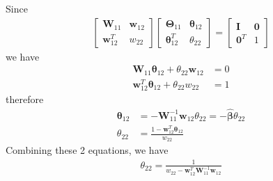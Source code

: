 \begin{exercise}
  Since 
  \begin{align}
    \left[
      \begin{array}{cc}
        \mathbf{W}_{11} & \mathbf{w}_{12} \\
        \mathbf{w}_{12}^T & w_{22}
      \end{array}
    \right]
    \left[
      \begin{array}{cc}
        \mathbf{\Theta}_{11} & \bm{\theta}_{12} \\
         \bm{\theta}_{12}^T & \theta_{22}
      \end{array}
    \right] = 
    \left[
      \begin{array}{cc}
        \mathbf{I} & \mathbf{0} \\
         \mathbf{0}^T & 1
      \end{array}
    \right] 
  \end{align}
  we have
  \begin{subequations}
    \begin{align}
      \mathbf{W}_{11}\bm{\theta}_{12} + \theta_{22}\mathbf{w}_{12} & = 0 \\
      \mathbf{w}_{12}^T\bm{\theta}_{12} + \theta_{22}w_{22} & = 1
    \end{align}
  \end{subequations}
  therefore
  \begin{subequations}
    \begin{align}
      \bm{\theta}_{12} &= -\mathbf{W}_{11}^{-1}\mathbf{w}_{12}\theta_{22} =
      -\hat{\bm{\beta}}\theta_{22} \\
      \theta_{22} &= \frac{1 - \mathbf{w}_{12}^T\bm{\theta}_{12}}{w_{22}}
    \end{align}
  \end{subequations}
  Combining these 2 equations, we have
  \begin{align}
    \theta_{22} = \frac{1}{w_22 -
    \mathbf{w}_{12}^T\mathbf{W}_{11}^{-1}\mathbf{w}_{12}}
  \end{align}
\end{exercise}

\begin{exercise}[(Program)]
\end{exercise}

\begin{exercise}[(Program)]
\end{exercise}

